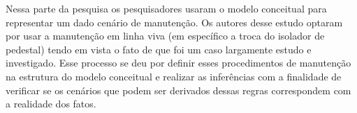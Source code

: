 Nessa parte da pesquisa os pesquisadores usaram o modelo conceitual para representar um dado cenário de manutenção. Os autores desse estudo optaram por usar a manutenção em linha viva (em específico a troca do isolador de pedestal) tendo em vista o fato de que foi um caso largamente estudo e investigado. Esse processo se deu por definir esses procedimentos de manutenção na estrutura do modelo conceitual e realizar as inferências com a finalidade de verificar se os cenários que podem ser derivados dessas regras correspondem com a realidade dos fatos. 